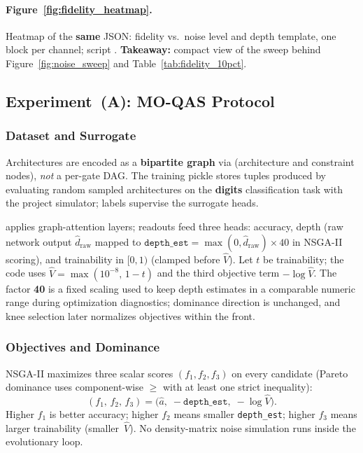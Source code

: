\paragraph{Figure~\ref{fig:fidelity_heatmap}.}
Heatmap of the \textbf{same} JSON: fidelity vs.\ noise level and depth template,
one block per channel; script .
\textbf{Takeaway:} compact view of the sweep behind Figure~\ref{fig:noise_sweep}
and Table~\ref{tab:fidelity_10pct}.

\subsection{Experiment~(A): MO-QAS Protocol}\label{ssec:moqas}

\subsubsection{Dataset and Surrogate}

Architectures are encoded as a \textbf{bipartite graph} via
 (architecture and constraint nodes),
\emph{not} a per\hyp gate DAG.
The training pickle  stores tuples produced by
evaluating random sampled architectures on the \textbf{digits} classification
task with the project simulator; labels supervise the surrogate heads.

 applies graph-attention layers; readouts feed
three heads: accuracy, depth (raw network output $\hat d_{\mathrm{raw}}$ mapped to
$\texttt{depth\_est}=\max(0,\hat d_{\mathrm{raw}})\times 40$ in NSGA\hyp II
scoring), and trainability in $[0,1)$ (clamped before $\hat V$).
Let $t$ be trainability; the code uses
$\hat V=\max(10^{-8},\,1-t)$ and the third objective term $-\log \hat V$.
The factor \textbf{40} is a fixed scaling used to keep depth estimates in a
comparable numeric range during optimization diagnostics; dominance direction is
unchanged, and knee selection later normalizes objectives within the front.

\subsubsection{Objectives and Dominance}

NSGA-II maximizes three scalar scores $(f_1,f_2,f_3)$ on every candidate
(Pareto dominance uses component-wise $\geq$ with at least one strict
inequality):
\begin{equation}\label{eq:moqas_objectives}
  (f_1,\,f_2,\,f_3)
  =
  \bigl(
    \hat a,\;
    -\texttt{depth\_est},\;
    -\log \hat V
  \bigr).
\end{equation}
Higher $f_1$ is better accuracy; higher $f_2$ means smaller \texttt{depth\_est};
higher $f_3$ means larger trainability (smaller~$\hat V$). No density-matrix
noise simulation runs inside the evolutionary loop.

